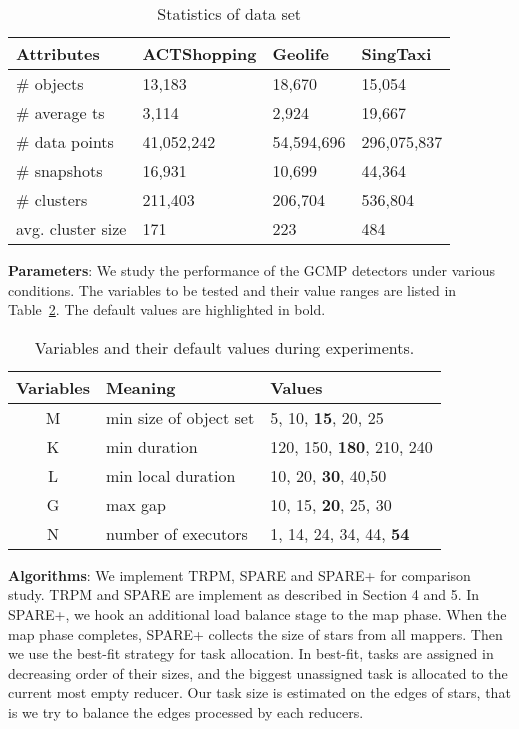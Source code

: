 \begin{table} [h]
\center
\small
\begin{tabular}{|l|l|l|l|}
\hline
 \textbf{Attributes}& \textbf{ACTShopping} &  \textbf{Geolife} &  \textbf{SingTaxi} \\ 
\hline 
\# objects  & 13,183 & 18,670 & 15,054\\ 
\hline
\# average ts & 3,114  & 2,924 & 19,667 \\ 
\hline
\# data points  & 41,052,242 & 54,594,696 & 296,075,837\\ 
\hline
\# snapshots  & 16,931 & 10,699 & 44,364\\ 
\hline
\# clusters  & 211,403  & 206,704& 536,804\\
\hline
avg. cluster size  & 171 & 223 & 484\\
\hline
\end{tabular}
\caption{Statistics of data set}
\label{exp:dataset}
\end{table}

\textbf{Parameters}: We study the performance of 
the GCMP detectors under various conditions. The variables
to be tested and their value ranges are listed in Table~\ref{tbl:parameters}. 
The default values are highlighted in bold.
\begin{table}[h]
\small
\begin{tabular}{c|l|l}
\hline 
\textbf{Variables} & \textbf{Meaning} & \textbf{Values} \\ 
\hline 
M & min size of object set &  5, 10,  \textbf{15}, 20, 25 \\ 
\hline 
K & min duration & 120, 150, \textbf{180}, 210, 240 \\ 
\hline 
L & min local duration & 10, 20, \textbf{30}, 40,50 \\ 
\hline 
G & max gap & 10, 15, \textbf{20}, 25, 30 \\ 
\hline
N & number of executors & 1, 14, 24, 34, 44, \textbf{54}\\ 
\hline 
\end{tabular} 
\caption{Variables and their default values during experiments.}
\label{tbl:parameters}
\end{table}

\textbf{Algorithms}: We implement TRPM, SPARE and SPARE+ for comparison study. TRPM and SPARE are implement as described in Section 4 and 5. In SPARE+, we hook an additional load balance stage to the map phase. When the map phase completes, SPARE+ collects the size of stars from all mappers. Then we use the best-fit strategy for task allocation. In best-fit, tasks are assigned in decreasing order of 
their sizes, and the biggest unassigned task is allocated to the current most empty reducer. Our task size is estimated on the edges of stars, that is we try to balance the edges processed by each reducers.

